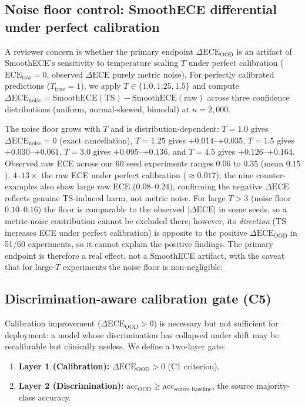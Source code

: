 \documentclass[review,12pt,nonatbib]{elsarticle}
\begin{document}
\subsection{Noise floor control: SmoothECE differential under perfect calibration}
\label{sec:noise_floor}
A reviewer concern is whether the primary endpoint
$\Delta\text{ECE}_{\text{OOD}}$ is an artifact of SmoothECE's
sensitivity to temperature scaling $T$ under perfect calibration
($\text{ECE}_{\text{raw}} = 0$, observed $\Delta\text{ECE}$ purely
metric noise). For perfectly calibrated predictions
($T_{\text{true}}=1$), we apply $T \in \{1.0, 1.25, 1.5\}$ and compute
$\Delta\text{ECE}_{\text{noise}} = \text{SmoothECE}(\text{TS}) - \text{SmoothECE}(\text{raw})$
across three confidence distributions (uniform, normal-skewed,
bimodal) at $n=2{,}000$.

The noise floor grows with $T$ and is distribution-dependent: $T=1.0$
gives $\Delta\text{ECE}_{\text{noise}} = 0$ (exact cancellation),
$T=1.25$ gives $+0.014$--$+0.035$, $T=1.5$ gives $+0.030$--$+0.061$,
$T=3.0$ gives $+0.095$--$+0.136$, and $T=4.5$ gives
$+0.126$--$+0.164$. Observed raw ECE across our 60 seed experiments
ranges $0.06$ to $0.35$ (mean $0.15$), $4$--$13\times$ the raw ECE
under perfect calibration ($\approx 0.017$); the nine counter-examples
also show large raw ECE ($0.08$--$0.24$), confirming the negative
$\Delta\text{ECE}$ reflects genuine TS-induced harm, not metric noise.
For large $T > 3$ (noise floor $0.10$--$0.16$) the floor is
comparable to the observed $|\Delta\text{ECE}|$ in some seeds, so a
metric-noise contribution cannot be excluded there; however, its
\emph{direction} (TS increases ECE under perfect calibration) is
opposite to the positive $\Delta\text{ECE}_{\text{OOD}}$ in 51/60
experiments, so it cannot explain the positive findings. The primary
endpoint is therefore a real effect, not a SmoothECE artifact, with
the caveat that for large-$T$ experiments the noise floor is
non-negligible.

\subsection{Discrimination-aware calibration gate (C5)}
\label{sec:gate}
Calibration improvement ($\Delta\text{ECE}_{\text{OOD}} > 0$) is
necessary but not sufficient for deployment: a model whose
discrimination has collapsed under shift may be recalibrable but
clinically useless. We define a two-layer gate:
\begin{enumerate}
    \item \textbf{Layer 1 (Calibration):} $\Delta\text{ECE}_{\text{OOD}} > 0$
    (C1 criterion).
    \item \textbf{Layer 2 (Discrimination):} $\text{acc}_{\text{OOD}} \geq
    \text{acc}_{\text{source baseline}}$, the source majority-class
    accuracy.
\end{enumerate}
\end{document}
